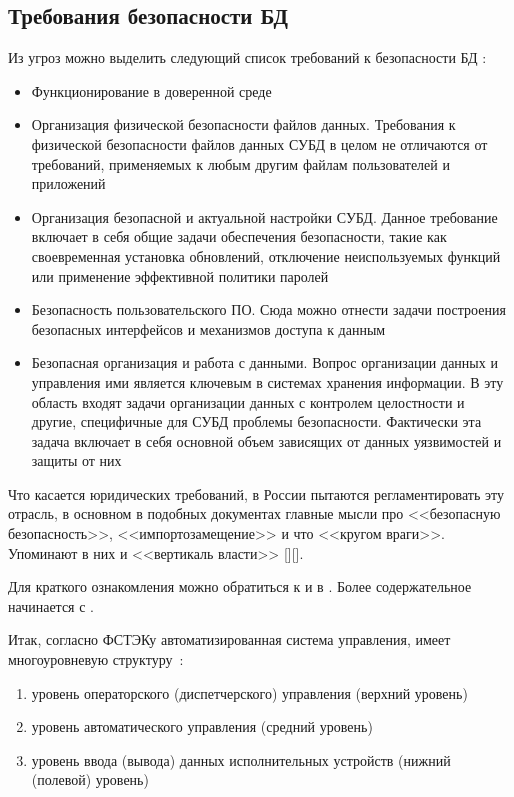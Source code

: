 \subsection{Требования безопасности БД}
Из угроз можно выделить следующий список требований к безопасности БД \autocite{LAPA}:
\begin{itemize}
	\item Функционирование в доверенной среде

	\item Организация физической безопасности файлов данных. Требования к физической безопасности файлов данных СУБД в целом не отличаются от требований, применяемых к любым другим файлам пользователей и приложений

	\item Организация безопасной и актуальной настройки СУБД. Данное требование включает в себя общие задачи обеспечения безопасности, такие как своевременная установка обновлений, отключение неиспользуемых функций или применение эффективной политики паролей

	\item Безопасность пользовательского ПО. Сюда можно отнести задачи построения безопасных интерфейсов и механизмов доступа к данным

	\item Безопасная организация и работа с данными. Вопрос организации данных и управления ими является ключевым в системах хранения информации. В эту область входят задачи организации данных с контролем целостности и другие, специфичные для СУБД проблемы безопасности. Фактически эта задача включает в себя основной объем зависящих от данных уязвимостей и защиты от них
\end{itemize}

Что касается юридических требований, в России пытаются регламентировать эту отрасль, в основном в подобных документах главные мысли про <<безопасную безопасность>>, <<импортозамещение>> и что <<кругом враги>>. Упоминают в них и <<вертикаль власти>> [\autocite{Mysev2019}][\autocite{Elin}].

Для краткого ознакомления можно обратиться к \autocite{CONS149FZ} и в \autocite{CONSUP351}. Более содержательное начинается с \autocite{FSTEKOBKIS}.

Итак, согласно ФСТЭКу автоматизированная система управления, имеет многоуровневую структуру~\label{pon:bez}:
\begin{enumerate}
	\item уровень операторского (диспетчерского) управления (верхний уровень)
	\item уровень автоматического управления (средний уровень)
	\item уровень ввода (вывода) данных исполнительных устройств (нижний (полевой) уровень)
\end{enumerate}

